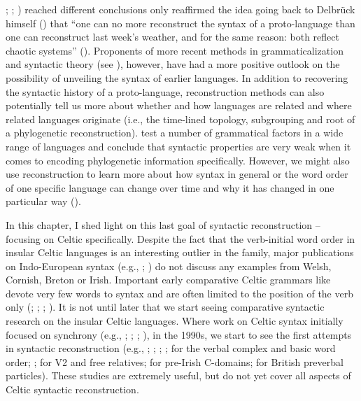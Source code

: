 \documentclass[output=paper,colorlinks,citecolor=brown]{langscibook}
\begin{document}
\citealt{mm:lehmann_proto-indo-european_1974}; \citealt{mm:friedrich_proto-indo-european_1975-1}; \citealt{mm:miller_indo-european_1975}) reached different conclusions only reaffirmed the idea going back to Delbrück himself (\cite[v-vi]{mm:delbruck_vergleichende_1893}) that ``one can no more reconstruct the syntax of a proto-language than one can reconstruct last week's weather, and for the same reason: both reflect chaotic systems'' (\cite[135]{mm:lightfoot_myths_2002}). Proponents of more recent methods in grammaticalization and syntactic theory (see ), however, have had a more positive outlook on the possibility of unveiling the syntax of earlier languages. In addition to recovering the syntactic history of a proto-language, reconstruction methods can also potentially tell us more about whether and how languages are related and where related languages originate (i.e., the time-lined topology, subgrouping and root of a phylogenetic reconstruction). \citet{mm:hartmannwalkden2024strength} test a number of grammatical factors in a wide range of languages and conclude that syntactic properties are very weak when it comes to encoding phylogenetic information specifically. However, we might also use reconstruction to learn more about how syntax in general or the word order of one specific language can change over time and why it has changed in one particular way (\cite[9]{mm:ferraresi_principles_2008}).

In this chapter, I shed light on this last goal of syntactic reconstruction -- focusing on Celtic specifically. Despite the fact that the verb-initial word order in insular Celtic languages is an interesting outlier in the family, major publications on Indo-European syntax (e.g., \citealt{mm:delbruck_vergleichende_1893}; \citealt{mm:lehmann_proto-indo-european_1974}) do not discuss any examples from Welsh, Cornish, Breton or Irish. Important early comparative Celtic grammars like \citet{mm:lewispedersen1961concise} devote very few words to syntax and are often limited to the position of the verb only (\cite[301]{mm:thurneysen1927altirische}; \citealt{mm:lewispedersen1961concise}; \citealt{mm:watkins_preliminaries_1964}; \citealt{mm:Meid1968}). It is not until later that we start seeing comparative syntactic research on the insular Celtic languages. Where work on Celtic syntax initially focused on synchrony (e.g., \citealt{mm:harlow_government_1981}; \citealt{mm:hendrick_celtic_2000}; \citealt{mm:mccloskey_scope_1996}; \citealt{mm:carnie_vso_2000}), in the 1990s, we start to see the first attempts in syntactic reconstruction (e.g., \citealt{mm:koch_prehistory_1991}; \citealt{mm:maccana_further_1991}; \citealt{mm:eskaevans1993continental}; \citealt{mm:isaac_issues_1993}; \citealt{mm:eska_syntax_1996} for the verbal complex and basic word order; \cite{mm:willis_syntactic_1998}; \citeyear{mm:willis_reconstructing_2011}  for V2 and free relatives; \citealt{mm:newton_development_2006} for pre-Irish C-domains; \citealt{mm:meelen_why_2016} for British preverbal particles). These studies are extremely useful, but do not yet cover all aspects of Celtic syntactic reconstruction.
\end{document}
